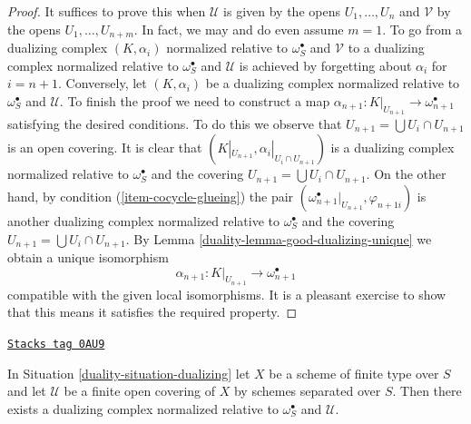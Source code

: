\begin{proof}

It suffices to prove this when $\mathcal{U}$ is given by the opens
$U_1, \ldots, U_n$ and $\mathcal{V}$ by the opens $U_1, \ldots, U_{n + m}$.
In fact, we may and do even assume $m = 1$.
To go from a dualizing complex $(K, \alpha_i)$ normalized
relative to $\omega_S^\bullet$ and $\mathcal{V}$ to a
dualizing complex normalized relative to $\omega_S^\bullet$ and $\mathcal{U}$
is achieved by forgetting about $\alpha_i$ for $i = n + 1$. Conversely, let
$(K, \alpha_i)$ be a dualizing complex normalized relative to
$\omega_S^\bullet$ and $\mathcal{U}$.
To finish the proof we need to construct a map
$\alpha_{n + 1} : K|_{U_{n + 1}} \to \omega_{n + 1}^\bullet$ satisfying
the desired conditions.
To do this we observe that $U_{n + 1} = \bigcup U_i \cap U_{n + 1}$
is an open covering.
It is clear that $(K|_{U_{n + 1}}, \alpha_i|_{U_i \cap U_{n + 1}})$
is a dualizing complex normalized relative to $\omega_S^\bullet$
and the covering $U_{n + 1} = \bigcup U_i \cap U_{n + 1}$.
On the other hand, by condition (\ref{item-cocycle-glueing}) the pair
$(\omega_{n + 1}^\bullet|_{U_{n + 1}}, \varphi_{n + 1i})$
is another dualizing complex normalized relative to $\omega_S^\bullet$
and the covering
$U_{n + 1} = \bigcup U_i \cap U_{n + 1}$.
By Lemma \ref{duality-lemma-good-dualizing-unique} we obtain a unique isomorphism
$$
\alpha_{n + 1} : K|_{U_{n + 1}} \longrightarrow \omega_{n + 1}^\bullet
$$
compatible with the given local isomorphisms.
It is a pleasant exercise to show that this means it satisfies
the required property.
\end{proof}

\begin{lemma}
\label{duality-lemma-existence-good-dualizing}
\href{https://stacks.math.columbia.edu/tag/0AU9}{\texttt{Stacks tag 0AU9}}

In Situation \ref{duality-situation-dualizing} let $X$ be a scheme of finite type
over $S$ and let $\mathcal{U}$ be a finite open covering
of $X$ by schemes separated over $S$. Then there exists
a dualizing complex normalized relative to $\omega_S^\bullet$ and
$\mathcal{U}$.
\end{lemma}

